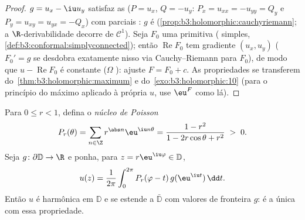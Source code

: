 \begin{proof}
$g = u_x - \iu u_y$ satisfaz as  ($P = u_x$, $Q = -u_y$: $P_x = u_{xx} = -u_{yy} = Q_y$ e
$P_y = u_{xy} = u_{yx} = -Q_x$) com parciais : $g$ é  (\cref{prop:b3:holomorphic:cauchyriemann}; a
$\R$-derivabilidade decorre de $\mathcal C^1$). Seja $F_0$ uma primitiva
( simples, \cref{def:b3:conformal:simplyconnected}); então $\operatorname{Re}F_0$ tem gradiente $(u_x, u_y)$
($F_0' = g$ se desdobra exatamente nisso via Cauchy--Riemann para
$F_0$), de modo que $u - \operatorname{Re}F_0$ é constante ($\Omega$ ): ajuste
$F = F_0 + c$. As propriedades se transferem do~\cref{thm:b3:holomorphic:maximum} e
do~\cref{exo:b3:holomorphic:10} (para o princípio do máximo aplicado à própria
$u$, use $\eu^{F}$ como lá).
\end{proof}

\begin{theorem}\label{thm:b3:conformal:poisson}
Para $0 \leq r < 1$, defina o \emph{núcleo de Poisson}
\[
P_r(\theta) = \sum_{n\in\Z}r^{\abs n}\eu^{\iu n\theta}
= \frac{1 - r^2}{1 - 2r\cos\theta + r^2} \;>\; 0 .
\]
Seja $g \colon \partial\mathbb D \to \R$  e ponha, para $z = r\eu^{\iu\varphi} \in \mathbb D$,
\[
u(z) = \frac1{2\pi}\int_0^{2\pi}
P_r(\varphi - t)\,g(\eu^{\iu t})\,\dd t .
\]
Então $u$ é harmônica em $\mathbb D$ e se estende  a $\bar{\mathbb D}$ com
valores de fronteira $g$: é a única  com essa
propriedade.
\end{theorem}


